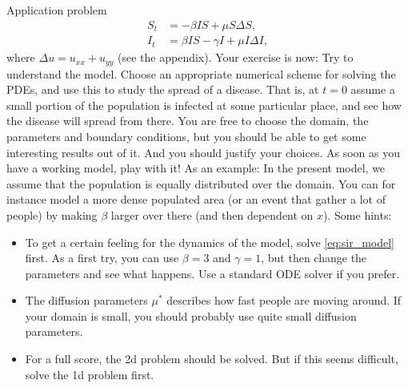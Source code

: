 \begin{railingbox}{Application problem}
    \begin{align}
        S_t & = -\beta IS + \mu S \Delta S, \nonumber \\
        I_t & = \beta IS - \gamma I + \mu I \Delta I, \label{eq:sir_model_space}
    \end{align}
    where \(\Delta u = u_{xx} + u_{yy}\) (see the appendix). Your exercise is now: Try to understand the
    model. Choose an appropriate numerical scheme for solving the PDEs, and use this to study the spread of a disease. That is, at \(t = 0\) assume a small portion of the population is infected at some particular place, and see how the disease
    will spread from there. You are free to choose the domain, the parameters and boundary conditions, but you should be able to get some interesting results out of it. And you should justify your choices.
    As soon as you have a working model, play with it! As an example: In the present model, we assume that the population is equally distributed over the domain. You can for instance model a more dense populated area (or an event that gather a lot of people) by making \(\beta\) larger over there (and then dependent on \(x\)).
    Some hints:
    \begin{itemize}
        \item To get a certain feeling for the dynamics of the model, solve \eqref{eq:sir_model} first. As a first try, you can use \(\beta = 3\) and \(\gamma = 1\), but then change the parameters and see what happens. Use a standard ODE solver if you prefer.
        \item The diffusion parameters \(\mu^*\) describes how fast people are moving around. If your domain is small, you should probably use quite small diffusion parameters.
        \item For a full score, the 2d problem should be solved. But if this seems difficult, solve the 1d problem first.
    \end{itemize}
\end{railingbox}

